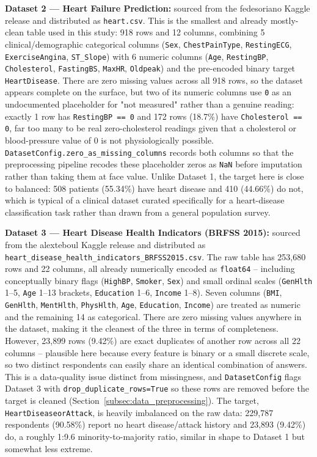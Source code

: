 \begin{sloppypar}
\textbf{Dataset 2 --- Heart Failure Prediction:} sourced from the fedesoriano
Kaggle release \cite{kaggle2020heartfailure} and distributed as
\texttt{heart.csv}. This is the smallest and already mostly-clean table used
in this study: 918 rows and 12 columns, combining 5 clinical/demographic
categorical columns (\texttt{Sex}, \texttt{ChestPainType}, \texttt{RestingECG},
\texttt{ExerciseAngina}, \texttt{ST\_Slope}) with 6 numeric columns
(\texttt{Age}, \texttt{RestingBP}, \texttt{Cholesterol}, \texttt{FastingBS},
\texttt{MaxHR}, \texttt{Oldpeak}) and the pre-encoded binary target
\texttt{HeartDisease}. There are zero missing values across all 918 rows,
so the dataset appears complete on the surface, but two of its numeric
columns use \texttt{0} as an undocumented placeholder for "not measured"
rather than a genuine reading: exactly 1 row has \texttt{RestingBP == 0} and
172 rows (18.7\%) have \texttt{Cholesterol == 0}, far too many to be real
zero-cholesterol readings given that a cholesterol or blood-pressure value of
0 is not physiologically possible. \texttt{DatasetConfig.\allowbreak zero\_as\_missing\_columns}
records both columns so that the preprocessing pipeline recodes these
placeholder zeros as \texttt{NaN} before imputation rather than taking them at
face value. Unlike Dataset 1, the target here is close to balanced: 508
patients (55.34\%) have heart disease and 410 (44.66\%) do not, which is
typical of a clinical dataset curated specifically for a heart-disease
classification task rather than drawn from a general population survey.

\textbf{Dataset 3 --- Heart Disease Health Indicators (BRFSS 2015):} sourced
from the alexteboul Kaggle release \cite{kaggle2015brfssindicators} and
distributed as \texttt{heart\_disease\_health\_indicators\_BRFSS2015.\allowbreak csv}. The
raw table has 253{,}680 rows and 22 columns, all already numerically encoded
as \texttt{float64} -- including conceptually binary flags (\texttt{HighBP},
\texttt{Smoker}, \texttt{Sex}) and small ordinal scales
(\texttt{GenHlth} 1--5, \texttt{Age} 1--13 brackets, \texttt{Education} 1--6,
\texttt{Income} 1--8). Seven columns (\texttt{BMI}, \texttt{GenHlth},
\texttt{MentHlth}, \texttt{PhysHlth}, \texttt{Age}, \texttt{Education},
\texttt{Income}) are treated as numeric and the remaining 14 as categorical.
There are zero missing values anywhere in the dataset, making it the cleanest
of the three in terms of completeness. However, 23{,}899 rows (9.42\%) are
exact duplicates of another row across all 22 columns -- plausible here
because every feature is binary or a small discrete scale, so two distinct
respondents can easily share an identical combination of answers. This is a
data-quality issue distinct from missingness, and \texttt{DatasetConfig}
flags Dataset 3 with \texttt{drop\_\allowbreak duplicate\_\allowbreak rows=True} so these rows are
removed before the target is cleaned (Section~\ref{subsec:data_preprocessing}).
The target, \texttt{HeartDiseaseorAttack}, is heavily imbalanced on the raw
data: 229{,}787 respondents (90.58\%) report no heart disease/attack history
and 23{,}893 (9.42\%) do, a roughly 1:9.6 minority-to-majority ratio, similar
in shape to Dataset 1 but somewhat less extreme.


\end{sloppypar}
